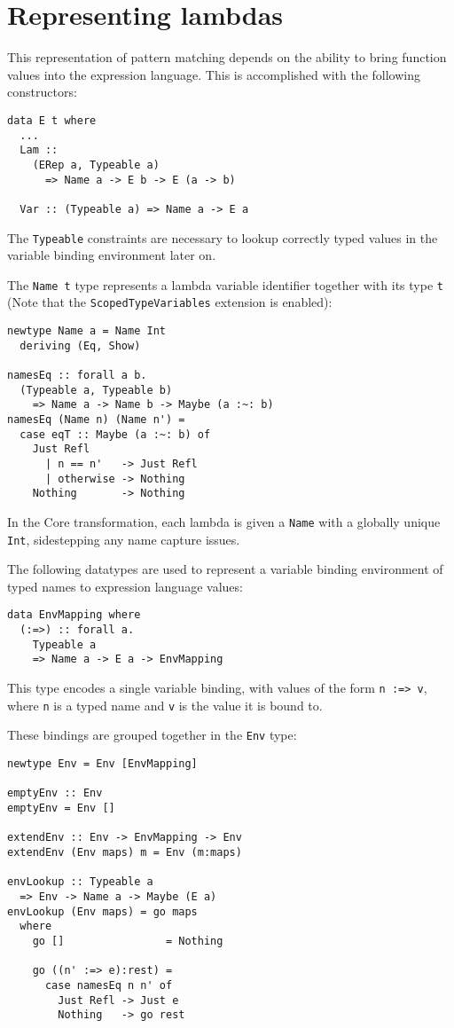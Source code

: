 \documentclass[sigplan,anonymous,review]{acmart}
\newcommand{\ttt}{\texttt}
\begin{document}
\section{Representing lambdas}
This representation of pattern matching depends on the ability to bring
function values into the expression language. This is accomplished
with the following constructors:

\begin{lstlisting}
data E t where
  ...
  Lam ::
    (ERep a, Typeable a)
      => Name a -> E b -> E (a -> b)

  Var :: (Typeable a) => Name a -> E a
\end{lstlisting}

The \ttt{Typeable} constraints are necessary to lookup correctly typed
values in the variable binding environment later on.

The \ttt{Name t} type represents a lambda variable identifier together with its
type \ttt{t} (Note that the \ttt{ScopedTypeVariables} extension is enabled):

\begin{lstlisting}
newtype Name a = Name Int
  deriving (Eq, Show)

namesEq :: forall a b.
  (Typeable a, Typeable b)
    => Name a -> Name b -> Maybe (a :~: b)
namesEq (Name n) (Name n') =
  case eqT :: Maybe (a :~: b) of
    Just Refl
      | n == n'   -> Just Refl
      | otherwise -> Nothing
    Nothing       -> Nothing
\end{lstlisting}

In the Core transformation, each lambda is given a \ttt{Name} with a globally
unique \ttt{Int}, sidestepping any name capture issues.

The following datatypes are used to represent a variable binding environment
of typed names to expression language values:

\begin{lstlisting}
data EnvMapping where
  (:=>) :: forall a.
    Typeable a
    => Name a -> E a -> EnvMapping
\end{lstlisting}

This type encodes a single variable binding, with values of the form
\ttt{n :=> v}, where \ttt{n} is a typed name and \ttt{v} is the value it is bound to.

These bindings are grouped together in the \ttt{Env} type:

\begin{lstlisting}
newtype Env = Env [EnvMapping]

emptyEnv :: Env
emptyEnv = Env []

extendEnv :: Env -> EnvMapping -> Env
extendEnv (Env maps) m = Env (m:maps)

envLookup :: Typeable a
  => Env -> Name a -> Maybe (E a)
envLookup (Env maps) = go maps
  where
    go []                = Nothing

    go ((n' :=> e):rest) =
      case namesEq n n' of
        Just Refl -> Just e
        Nothing   -> go rest
\end{lstlisting}
\end{document}
